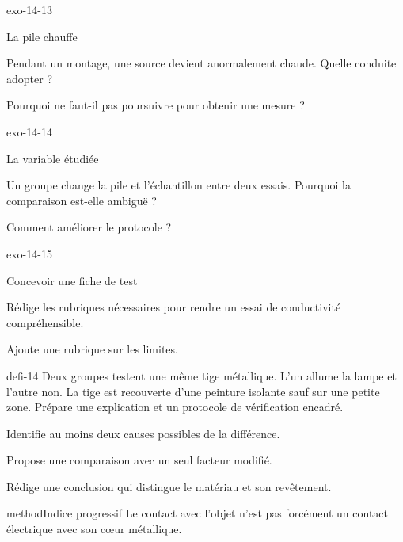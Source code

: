 \documentclass[12pt,twoside,openany]{book}
\begin{document}
\begin{blocLivre}{exo-14-13}
\begin{exercice}[3]{La pile chauffe}
\begin{questions}
\item Pendant un montage, une source devient anormalement chaude. Quelle conduite adopter ?
\item Pourquoi ne faut-il pas poursuivre pour obtenir une mesure ?
\end{questions}
\end{exercice}\end{blocLivre}
\begin{blocLivre}{exo-14-14}
\begin{exercice}[3]{La variable étudiée}
\begin{questions}
\item Un groupe change la pile et l’échantillon entre deux essais. Pourquoi la comparaison est-elle ambiguë ?
\item Comment améliorer le protocole ?
\end{questions}
\end{exercice}\end{blocLivre}
\begin{blocLivre}{exo-14-15}
\begin{exercice}[3]{Concevoir une fiche de test}
\begin{questions}
\item Rédige les rubriques nécessaires pour rendre un essai de conductivité compréhensible.
\item Ajoute une rubrique sur les limites.
\end{questions}
\end{exercice}\end{blocLivre}
\label{defi-ex-14}
\begin{pcFiche}{defi-14}
Deux groupes testent une même tige métallique. L’un allume la lampe et l’autre non. La tige est recouverte d’une peinture isolante sauf sur une petite zone. Prépare une explication et un protocole de vérification encadré.\par
{}
\begin{questions}
\item Identifie au moins deux causes possibles de la différence.
\item Propose une comparaison avec un seul facteur modifié.
\item Rédige une conclusion qui distingue le matériau et son revêtement.
\end{questions}
\begin{pcEncadre}{method}{Indice progressif}
Le contact avec l’objet n’est pas forcément un contact électrique avec son cœur métallique.\par
\end{pcEncadre}
\end{pcFiche}
\end{document}
